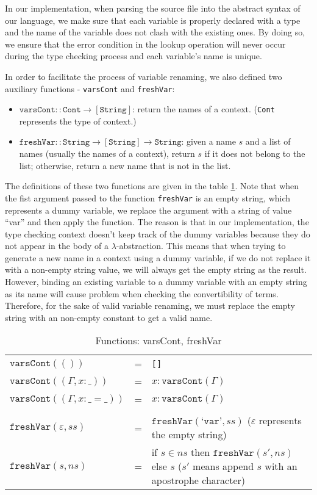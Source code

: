 In our implementation, when parsing the source file into the abstract syntax of our language, we make sure that each variable is properly declared with a type and the name of the variable does not clash with the existing ones. By doing so, we ensure that the error condition in the lookup operation will never occur during the type checking process and each variable's name is unique.

In order to facilitate the process of variable renaming, we also defined two auxiliary functions - \texttt{varsCont} and \texttt{freshVar}:
\begin{itemize}
  \item $\texttt{varsCont} :: \texttt{Cont} \to [\texttt{String}]$: return the names of a context. (\texttt{Cont} represents the type of context.)
  \item $\texttt{freshVar} :: \texttt{String} \to [\texttt{String}] \to \texttt{String}$: given a name $s$ and a list of names (usually the names of a context), return $s$ if it does not belong to the list; otherwise, return a new name that is not in the list.
\end{itemize}

The definitions of these two functions are given in the table \ref{tab:var-rename}. Note that when the fist argument passed to the function \texttt{freshVar} is an empty string, which represents a dummy variable, we replace the argument with a string of value ``var'' and then apply the function. The reason is that in our implementation, the type checking context doesn't keep track of the dummy variables because they do not appear in the body of a $\lambda$-abstraction. This means that when trying to generate a new name in a context using a dummy variable, if we do not replace it with a non-empty string value, we will always get the empty string as the result. However, binding an existing variable to a dummy variable with an empty string as its name will cause problem when checking the convertibility of terms. Therefore, for the sake of valid variable renaming, we must replace the empty string with an non-empty constant to get a valid name.  

\begin{table}[h] 
  \centering
  \begin{tabular}{l l p{6cm}}
    $\texttt{varsCont}(())$ & = & \texttt{[]} \\
    $\texttt{varsCont}((\Gamma, x : \_))$ & = & $x : \texttt{varsCont}(\Gamma)$ \\
    $\texttt{varsCont}((\Gamma, x : \_ = \_))$ & = & $x : \texttt{varsCont}(\Gamma)$ \\
    \\ 
    $\texttt{freshVar}(\varepsilon, ss)$ & = & $\texttt{freshVar}(\texttt{`var'}, ss)$ ($\varepsilon$ represents the empty string)\\
    $\texttt{freshVar}(s, ns)$ & = & if $s \in ns$ then $\texttt{freshVar}(s', ns)$ else $s$ ($s'$ means append $s$ with an apostrophe character)
  \end{tabular}
  \caption{Functions: varsCont, freshVar}
  \label{tab:var-rename}
\end{table}




